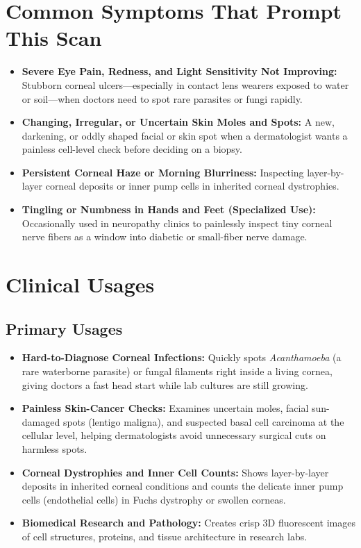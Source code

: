 \section{Common Symptoms That Prompt This Scan}
\begin{itemize}
    \item \textbf{Severe Eye Pain, Redness, and Light Sensitivity Not Improving:} Stubborn corneal ulcers---especially in contact lens wearers exposed to water or soil---when doctors need to spot rare parasites or fungi rapidly.
    \item \textbf{Changing, Irregular, or Uncertain Skin Moles and Spots:} A new, darkening, or oddly shaped facial or skin spot when a dermatologist wants a painless cell-level check before deciding on a biopsy.
    \item \textbf{Persistent Corneal Haze or Morning Blurriness:} Inspecting layer-by-layer corneal deposits or inner pump cells in inherited corneal dystrophies.
    \item \textbf{Tingling or Numbness in Hands and Feet (Specialized Use):} Occasionally used in neuropathy clinics to painlessly inspect tiny corneal nerve fibers as a window into diabetic or small-fiber nerve damage.
\end{itemize}

\section{Clinical Usages}

\subsection{Primary Usages}
\begin{itemize}
    \item \textbf{Hard-to-Diagnose Corneal Infections:} Quickly spots \textit{Acanthamoeba} (a rare waterborne parasite) or fungal filaments right inside a living cornea, giving doctors a fast head start while lab cultures are still growing.
    \item \textbf{Painless Skin-Cancer Checks:} Examines uncertain moles, facial sun-damaged spots (lentigo maligna), and suspected basal cell carcinoma at the cellular level, helping dermatologists avoid unnecessary surgical cuts on harmless spots.
    \item \textbf{Corneal Dystrophies and Inner Cell Counts:} Shows layer-by-layer deposits in inherited corneal conditions and counts the delicate inner pump cells (endothelial cells) in Fuchs dystrophy or swollen corneas.
    \item \textbf{Biomedical Research and Pathology:} Creates crisp 3D fluorescent images of cell structures, proteins, and tissue architecture in research labs.
\end{itemize}

